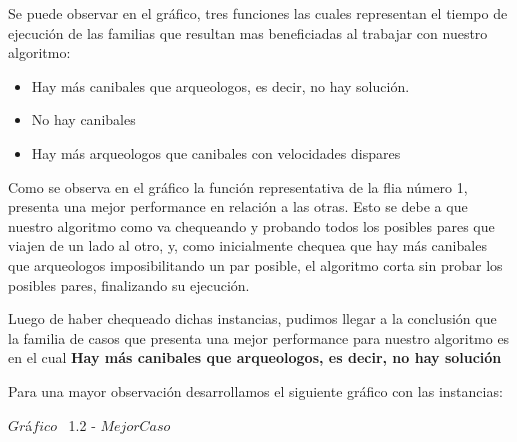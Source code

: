 Se puede observar en el gr\'afico, tres funciones las cuales representan el tiempo de ejecuci\'on de las familias que resultan mas beneficiadas al trabajar con nuestro algoritmo:\\
\begin{itemize}
\item Hay m\'as canibales que arqueologos, es decir, no hay soluci\'on.
\item No hay canibales
\item Hay m\'as arqueologos que canibales con velocidades dispares
\end{itemize}

Como se observa en el gr\'afico la funci\'on representativa de la flia n\'umero 1, presenta una mejor performance en relaci\'on a las otras. Esto se debe a que nuestro algoritmo como  va chequeando y probando todos los posibles pares que viajen de un lado al otro, y, como inicialmente chequea que hay m\'as canibales que arqueologos imposibilitando un par posible, el algoritmo corta sin probar los posibles pares, finalizando su ejecuci\'on.

Luego de haber chequeado dichas instancias, pudimos llegar a la conclusi\'on que la familia de casos que presenta una mejor performance para nuestro algoritmo
es en el cual \textbf{Hay m\'as canibales que arqueologos, es decir, no hay soluci\'on}

Para una mayor observaci\'on desarrollamos el siguiente gr\'afico con las instancias:\\

\vspace*{0.3cm} \vspace*{0.3cm}
  \begin{center}
 {$Gr$\'a$fico$ \ 1.2 - $Mejor Caso$}
  \end{center}
  \vspace*{0.3cm}
  


